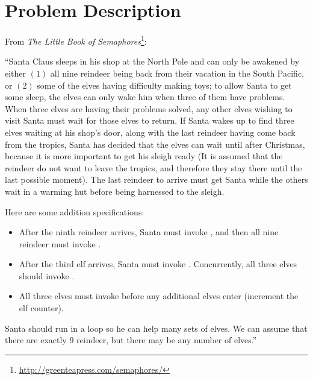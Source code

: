 \chapter{Problem Description}
\label{chap:problem}
From \textit{The Little Book of Semaphores}\footnote{\url{http://greenteapress.com/semaphores/}}:

``Santa Claus sleeps in his shop at the North Pole and can only be awakened by
either $(1)$ all nine reindeer being back from their vacation in the South
Pacific, or $(2)$ some of the elves having difficulty making toys; to allow Santa
to get some sleep, the elves can only wake him when three of them have
problems. When three elves are having their problems solved, any other elves
wishing to visit Santa must wait for those elves to return. If Santa wakes up
to find three elves waiting at his shop’s door, along with the last reindeer
having come back from the tropics, Santa has decided that the elves can wait
until after Christmas, because it is more important to get his sleigh ready
(It is assumed that the reindeer do not want to leave the tropics, and
therefore they stay there until the last possible moment). The last reindeer
to arrive must get Santa while the others wait in a warming hut before being
harnessed to the sleigh.

Here are some addition specifications:

\begin{itemize}
\item After the ninth reindeer arrives, Santa must invoke , and
then all nine reindeer must invoke .
\item After the third elf arrives, Santa must invoke . Concurrently,
all three elves should invoke .
\item All three elves must invoke  before any additional elves enter
(increment the elf counter).
\end{itemize}

Santa should run in a loop so he can help many sets of elves. We can assume
that there are exactly $9$ reindeer, but there may be any number of elves.''

